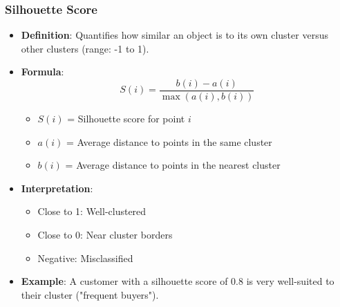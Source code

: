 \documentclass{beamer}
\begin{document}
\begin{frame}[fragile]
    \frametitle{Silhouette Score}
    \begin{itemize}
        \item \textbf{Definition}: Quantifies how similar an object is to its own cluster versus other clusters (range: -1 to 1).
        \item \textbf{Formula}:
        \begin{equation}
            S(i) = \frac{b(i) - a(i)}{\max(a(i), b(i))}
        \end{equation}
        \begin{itemize}
            \item \( S(i) \) = Silhouette score for point \( i \)
            \item \( a(i) \) = Average distance to points in the same cluster
            \item \( b(i) \) = Average distance to points in the nearest cluster
        \end{itemize}
        \item \textbf{Interpretation}:
        \begin{itemize}
            \item Close to 1: Well-clustered
            \item Close to 0: Near cluster borders
            \item Negative: Misclassified
        \end{itemize}
        \item \textbf{Example}: A customer with a silhouette score of 0.8 is very well-suited to their cluster ("frequent buyers").
    \end{itemize}
\end{frame}
\end{document}
